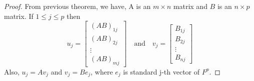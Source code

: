 \documentclass[12pt, a4paper]{article}
\theoremstyle{definition}
\theoremstyle{remark}
\begin{document}
\begin{proof}
    From previous theorem, we have, A is an $m \times n$ matrix and $B$ is an $n \times p$ matrix. If $1 \le j \le p$ then
    \[
    u_j = \begin{bmatrix}
        (AB)_{1j} \\ (AB)_{2j} \\ \vdots \\ (AB)_{mj}
    \end{bmatrix} \quad \text{and} \quad 
    v_j = \begin{bmatrix}
        B_{1j} \\ B_{2j} \\ \vdots \\ B_{nj}
    \end{bmatrix}
    \]
    Also, $u_j=Av_j$ and $v_j=Be_j$, where $e_j$ is standard j-th vector of $F^p$.


\end{proof}
\end{document}
